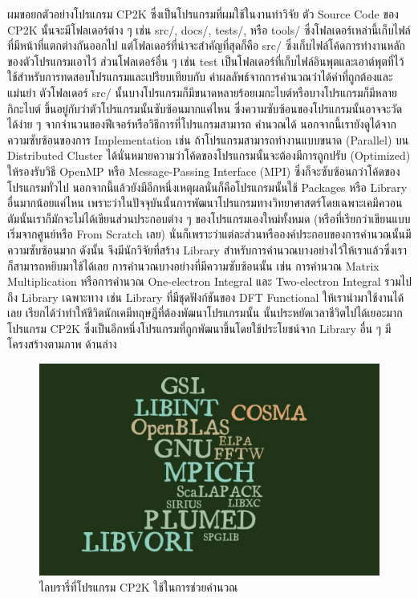 ผมขอยกตัวอย่างโปรแกรม CP2K ซึ่งเป็นโปรแกรมที่ผมใช้ในงานทำวิจัย ตัว Source Code ของ CP2K นั้นจะมีโฟลเดอร์ต่าง ๆ เช่น src/, docs/,
tests/, หรือ tools/ ซึ่งโฟลเดอร์เหล่านี้เก็บไฟล์ที่มีหน้าที่แตกต่างกันออกไป แต่โฟลเดอร์ที่น่าจะสำคัญที่สุดก็คือ src/ ซึ่งเก็บไฟล์โค้ดการทำงานหลัก%
ของตัวโปรแกรมเอาไว้ ส่วนโฟลเดอร์อื่น ๆ เช่น test เป็นโฟลเดอร์ที่เก็บไฟล์อินพุตและเอาต์พุตที่ไว้ใช้สำหรับการทดสอบโปรแกรมและเปรียบเทียบกับ%
ค่าผลลัพธ์จากการคำนวณว่าได้ค่าที่ถูกต้องและแม่นยำ ตัวโฟลเดอร์ src/ นั้นบางโปรแกรมก็มีขนาดหลายร้อยเมกะไบต์หรือบางโปรแกรมก็มีหลายกิกะไบต์
ขึ้นอยู่กับว่าตัวโปรแกรมนั้นซับซ้อนมากแค่ไหน ซึ่งความซับซ้อนของโปรแกรมนั้นอาจจะวัดได้ง่าย ๆ จากจำนวนของฟีเจอร์หรือวิธีการที่โปรแกรมสามารถ%
คำนวณได้ นอกจากนี้เรายังดูได้จากความซับซ้อนของการ Implementation เช่น ถ้าโปรแกรมสามารถทำงานแบบขนาด (Parallel) บน Distributed
Cluster ได้นั่นหมายความว่าโค้ดของโปรแกรมนั้นจะต้องมีการถูกปรับ (Optimized) ให้รองรับวิธี OpenMP หรือ Message-Passing Interface
(MPI) ซึ่งก็จะซับซ้อนกว่าโค้ดของโปรแกรมทั่วไป นอกจากนี้แล้วยังมีอีกหนึ่งเหตุผลนั่นก็คือโปรแกรมนั้นใช้ Packages หรือ Library อื่นมากน้อยแค่ไหน
เพราะว่าในปัจจุบันนั้นการพัฒนาโปรแกรมทางวิทยาศาสตร์โดยเฉพาะเคมีควอนตัมนั้นเราก็มักจะไม่ได้เขียนส่วนประกอบต่าง ๆ ของโปรแกรมเองใหม่ทั้งหมด
(หรือที่เรียกว่าเขียนแบบเริ่มจากศูนย์หรือ From Scratch เลย) นั่นก็เพราะว่าแต่ละส่วนหรือองค์ประกอบของการคำนวณนั้นมีความซับซ้อนมาก ดังนั้น%
จึงมีนักวิจัยที่สร้าง Library สำหรับการคำนวณบางอย่างไว้ให้เราแล้วซึ่งเราก็สามารถหยิบมาใช้ได้เลย การคำนวณบางอย่างที่มีความซับซ้อนนั้น เช่น
การคำนวณ Matrix Multiplication หรือการคำนวณ One-electron Integral และ Two-electron Integral รวมไปถึง Library
เฉพาะทาง เช่น Library ที่มีชุดฟังก์ชันของ DFT Functional ให้เรานำมาใช้งานได้เลย เรียกได้ว่าทำให้ชีวิตนักเคมีทฤษฎีที่ต้องพัฒนาโปรแกรมนั้น%
นั้นประหยัดเวลาชีวิตไปได้เยอะมาก โปรแกรม CP2K ซึ่งเป็นอีกหนึ่งโปรแกรมที่ถูกพัฒนาขึ้นโดยใช้ประโยชน์จาก Library อื่น ๆ มีโครงสร้างตามภาพ%
ด้านล่าง

\begin{figure}[htbp]
  \centering
  \includegraphics[width=0.7\linewidth]{fig/cp2k-lib.jpg}
  \caption{ไลบรารี่ที่โปรแกรม CP2K ใช้ในการช่วยคำนวณ}
  \label{fig:cp2k_lib}
\end{figure}

